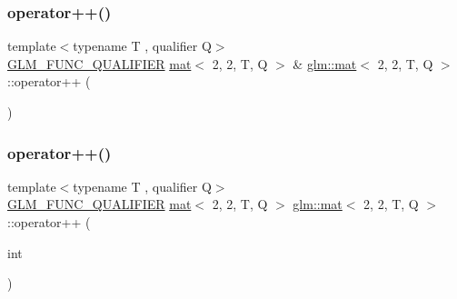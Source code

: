 \mbox{\label{structglm_1_1mat_3_012_00_012_00_01_t_00_01_q_01_4_a3ba78b4e4d01ba944fab26b8286acac4}} 
\subsubsection{\texorpdfstring{operator++()}{operator++()}\hspace{0.1cm}{\footnotesize\ttfamily [1/2]}}
{\footnotesize\ttfamily template$<$typename T , qualifier Q$>$ \\
\hyperlink{setup_8hpp_a33fdea6f91c5f834105f7415e2a64407}{G\+L\+M\+\_\+\+F\+U\+N\+C\+\_\+\+Q\+U\+A\+L\+I\+F\+I\+ER} \hyperlink{structglm_1_1mat}{mat}$<$ 2, 2, T, Q $>$ \& \hyperlink{structglm_1_1mat}{glm\+::mat}$<$ 2, 2, T, Q $>$\+::operator++ (\begin{DoxyParamCaption}{ }\end{DoxyParamCaption})}

\mbox{\label{structglm_1_1mat_3_012_00_012_00_01_t_00_01_q_01_4_a35434d16d35db785027c0d3b8b9c78b7}} 
\subsubsection{\texorpdfstring{operator++()}{operator++()}\hspace{0.1cm}{\footnotesize\ttfamily [2/2]}}
{\footnotesize\ttfamily template$<$typename T , qualifier Q$>$ \\
\hyperlink{setup_8hpp_a33fdea6f91c5f834105f7415e2a64407}{G\+L\+M\+\_\+\+F\+U\+N\+C\+\_\+\+Q\+U\+A\+L\+I\+F\+I\+ER} \hyperlink{structglm_1_1mat}{mat}$<$ 2, 2, T, Q $>$ \hyperlink{structglm_1_1mat}{glm\+::mat}$<$ 2, 2, T, Q $>$\+::operator++ (\begin{DoxyParamCaption}\item[{int}]{ }\end{DoxyParamCaption})}

\mbox{\label{structglm_1_1mat_3_012_00_012_00_01_t_00_01_q_01_4_acb56f312f0c6017e051b447d4bdaf2e1}} 
